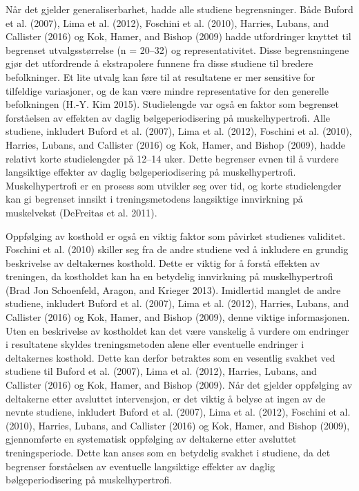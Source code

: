 \documentclass[
  letterpaper,
  DIV=11,
  numbers=noendperiod]{scrreprt}
\begin{document}
Når det gjelder generaliserbarhet, hadde alle studiene begrensninger.
Både Buford et al. (2007), Lima et al. (2012), Foschini et al. (2010),
Harries, Lubans, and Callister (2016) og Kok, Hamer, and Bishop (2009)
hadde utfordringer knyttet til begrenset utvalgsstørrelse (n = 20--32)
og representativitet. Disse begrensningene gjør det utfordrende å
ekstrapolere funnene fra disse studiene til bredere befolkninger. Et
lite utvalg kan føre til at resultatene er mer sensitive for tilfeldige
variasjoner, og de kan være mindre representative for den generelle
befolkningen (H.-Y. Kim 2015). Studielengde var også en faktor som
begrenset forståelsen av effekten av daglig bølgeperiodisering på
muskelhypertrofi. Alle studiene, inkludert Buford et al. (2007), Lima et
al. (2012), Foschini et al. (2010), Harries, Lubans, and Callister
(2016) og Kok, Hamer, and Bishop (2009), hadde relativt korte
studielengder på 12--14 uker. Dette begrenser evnen til å vurdere
langsiktige effekter av daglig bølgeperiodisering på muskelhypertrofi.
Muskelhypertrofi er en prosess som utvikler seg over tid, og korte
studielengder kan gi begrenset innsikt i treningsmetodens langsiktige
innvirkning på muskelvekst (DeFreitas et al. 2011).

Oppfølging av kosthold er også en viktig faktor som påvirket studienes
validitet. Foschini et al. (2010) skiller seg fra de andre studiene ved
å inkludere en grundig beskrivelse av deltakernes kosthold. Dette er
viktig for å forstå effekten av treningen, da kostholdet kan ha en
betydelig innvirkning på muskelhypertrofi (Brad Jon Schoenfeld, Aragon,
and Krieger 2013). Imidlertid manglet de andre studiene, inkludert
Buford et al. (2007), Lima et al. (2012), Harries, Lubans, and Callister
(2016) og Kok, Hamer, and Bishop (2009), denne viktige informasjonen.
Uten en beskrivelse av kostholdet kan det være vanskelig å vurdere om
endringer i resultatene skyldes treningsmetoden alene eller eventuelle
endringer i deltakernes kosthold. Dette kan derfor betraktes som en
vesentlig svakhet ved studiene til Buford et al. (2007), Lima et al.
(2012), Harries, Lubans, and Callister (2016) og Kok, Hamer, and Bishop
(2009). Når det gjelder oppfølging av deltakerne etter avsluttet
intervensjon, er det viktig å belyse at ingen av de nevnte studiene,
inkludert Buford et al. (2007), Lima et al. (2012), Foschini et al.
(2010), Harries, Lubans, and Callister (2016) og Kok, Hamer, and Bishop
(2009), gjennomførte en systematisk oppfølging av deltakerne etter
avsluttet treningsperiode. Dette kan anses som en betydelig svakhet i
studiene, da det begrenser forståelsen av eventuelle langsiktige
effekter av daglig bølgeperiodisering på muskelhypertrofi.
\end{document}
